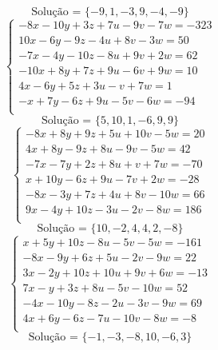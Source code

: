 \documentclass[12pt,oneside,a4paper]{article}
\begin{document}
\begin{equation*}
\text{Solução = }\{-9,1,-3,9,-4,-9\}
\end{equation*}
\vspace{\baselineskip}
\begin{equation*}
\begin{cases}
-8x-10y+3z+7u-9v-7w=-323 \\
10x-6y-9z-4u+8v-3w=50 \\
-7x-4y-10z-8u+9v+2w=62 \\
-10x+8y+7z+9u-6v+9w=10 \\
4x-6y+5z+3u-v+7w=1 \\
-x+7y-6z+9u-5v-6w=-94 \\
\end{cases}
\end{equation*}
\begin{equation*}
\text{Solução = }\{5,10,1,-6,9,9\}
\end{equation*}
\vspace{\baselineskip}
\begin{equation*}
\begin{cases}
-8x+8y+9z+5u+10v-5w=20 \\
4x+8y-9z+8u-9v-5w=42 \\
-7x-7y+2z+8u+v+7w=-70 \\
x+10y-6z+9u-7v+2w=-28 \\
-8x-3y+7z+4u+8v-10w=66 \\
9x-4y+10z-3u-2v-8w=186 \\
\end{cases}
\end{equation*}
\begin{equation*}
\text{Solução = }\{10,-2,4,4,2,-8\}
\end{equation*}
\vspace{\baselineskip}
\begin{equation*}
\begin{cases}
x+5y+10z-8u-5v-5w=-161 \\
-8x-9y+6z+5u-2v-9w=22 \\
3x-2y+10z+10u+9v+6w=-13 \\
7x-y+3z+8u-5v-10w=52 \\
-4x-10y-8z-2u-3v-9w=69 \\
4x+6y-6z-7u-10v-8w=-8 \\
\end{cases}
\end{equation*}
\begin{equation*}
\text{Solução = }\{-1,-3,-8,10,-6,3\}
\end{equation*}
\end{document}
